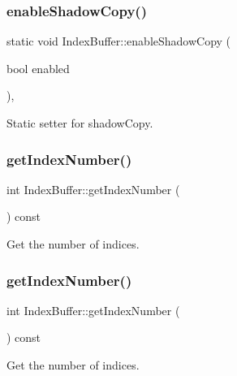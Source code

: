 \subsubsection{\texorpdfstring{enable\+Shadow\+Copy()}{enableShadowCopy()}\hspace{0.1cm}{\footnotesize\ttfamily [2/2]}}
{\footnotesize\ttfamily static void Index\+Buffer\+::enable\+Shadow\+Copy (\begin{DoxyParamCaption}\item[{bool}]{enabled }\end{DoxyParamCaption})\hspace{0.3cm}{\ttfamily [inline]}, {\ttfamily [static]}}

Static setter for shadow\+Copy. \mbox{\label{classIndexBuffer_a29e7b1441a2501111ae9ea3e91ad842c}} 
\subsubsection{\texorpdfstring{get\+Index\+Number()}{getIndexNumber()}\hspace{0.1cm}{\footnotesize\ttfamily [1/2]}}
{\footnotesize\ttfamily int Index\+Buffer\+::get\+Index\+Number (\begin{DoxyParamCaption}{ }\end{DoxyParamCaption}) const}

Get the number of indices. \mbox{\label{classIndexBuffer_a29e7b1441a2501111ae9ea3e91ad842c}} 
\subsubsection{\texorpdfstring{get\+Index\+Number()}{getIndexNumber()}\hspace{0.1cm}{\footnotesize\ttfamily [2/2]}}
{\footnotesize\ttfamily int Index\+Buffer\+::get\+Index\+Number (\begin{DoxyParamCaption}{ }\end{DoxyParamCaption}) const}

Get the number of indices. \mbox{\label{classIndexBuffer_a3c585378aeead477542951d977fbf9d5}} 
